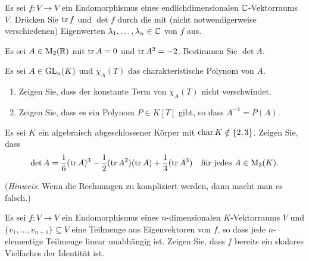 \documentclass[a4paper,10pt]{scrartcl}
\begin{document}
\begin{question}
  Es sei $f \colon V \to V$ ein Endomorphismus eines endlichdimensionalen $\mathbb{C}$-Vektorraums $V$.
  Drücken Sie $\operatorname{tr} f$ und $\det f$ durch die  mit (nicht notwendigerweise verschiedenen) Eigenwerten $\lambda_1, \dotsc, \lambda_n \in \mathbb{C}$ von $f$ aus.
\end{question}


\begin{question}
  Es sei $A \in \operatorname{M}_2(\mathbb{R})$ mit $\operatorname{tr} A = 0$ und $\operatorname{tr} A^2 = -2$.
  Bestimmen Sie $\det A$.
\end{question}


\begin{question}
  Es sei $A \in \operatorname{GL}_n(K)$ und $\chi_A(T)$ das charakteristische Polynom von $A$.
  \begin{enumerate}[leftmargin=*]
    \item
      Zeigen Sie, dass der konstante Term von $\chi_A(T)$ nicht verschwindet.
    \item
      Zeigen Sie, dass es ein Polynom $P \in K[T]$ gibt, so dass $A^{-1} = P(A)$.
  \end{enumerate}
\end{question}


\begin{question}
  Es sei $K$ ein algebraisch abgeschlossener Körper mit $\operatorname{char} K \notin \{2,3\}$.
  Zeigen Sie, dass
  \[
    \det A = \frac{1}{6} (\operatorname{tr} A)^3 - \frac{1}{2} (\operatorname{tr} A^2)(\operatorname{tr} A) + \frac{1}{3} (\operatorname{tr} A^3)
    \quad
    \text{für jedes $A \in \operatorname{M}_3(K)$}.
  \]
  
  (\emph{Hinweis}:
   Wenn die Rechnungen zu kompliziert werden, dann macht man es falsch.)
\end{question}


\begin{question}
  Es sei $f \colon V \to V$ ein Endomorphismus eines $n$-dimensionalen $K$-Vektorraums $V$ und $\{ v_1, \dotsc, v_{n+1} \} \subseteq V$ eine Teilmenge aus Eigenvektoren von $f$, so dass jede $n$-elementige Teilmenge linear unabhängig ist.
  Zeigen Sie, dass $f$ bereits ein skalares Vielfaches der Identität ist.
\end{question}











\end{document}
